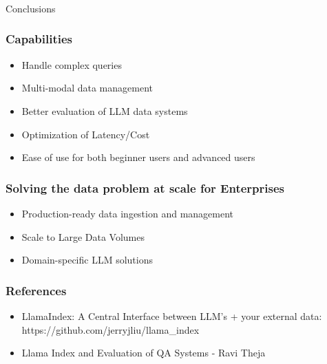 \begin{frame}[fragile]\frametitle{}
\begin{center}
{\Large Conclusions}
\end{center}
\end{frame}


\begin{frame}[fragile]\frametitle{Capabilities}


\begin{itemize}
\item Handle complex queries
\item Multi-modal data management
\item Better evaluation of LLM data systems
\item Optimization of Latency/Cost
\item Ease of use for both beginner users and advanced users
\end{itemize}	

\end{frame}

\begin{frame}[fragile]\frametitle{Solving the data problem at scale for Enterprises}


\begin{itemize}
\item Production-ready data ingestion and management
\item Scale to Large Data Volumes
\item Domain-specific LLM solutions
\end{itemize}	

\end{frame}





\begin{frame}[fragile]\frametitle{References}


\begin{itemize}
\item LlamaIndex: A Central Interface between LLM’s + your external data: https://github.com/jerryjliu/llama\_index
\item Llama Index and Evaluation of QA Systems - Ravi Theja

\end{itemize}


\end{frame}